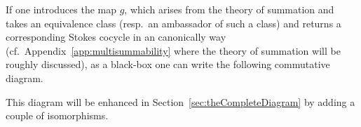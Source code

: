 If one introduces the map $g$, which arises from the theory of summation and
takes an equivalence class (resp.\ an ambassador of such a class) and returns a
corresponding Stokes cocycle in an canonically way
(cf.\ Appendix~\ref{app:multisummability} where the theory of summation  will
be roughly discussed), as a black-box one can write the following commutative
diagram.
\begin{center}
\end{center}\label{page:ofPreDiagram}
This diagram will be enhanced in Section~\ref{sec:theCompleteDiagram} by
adding a couple of isomorphisms.
